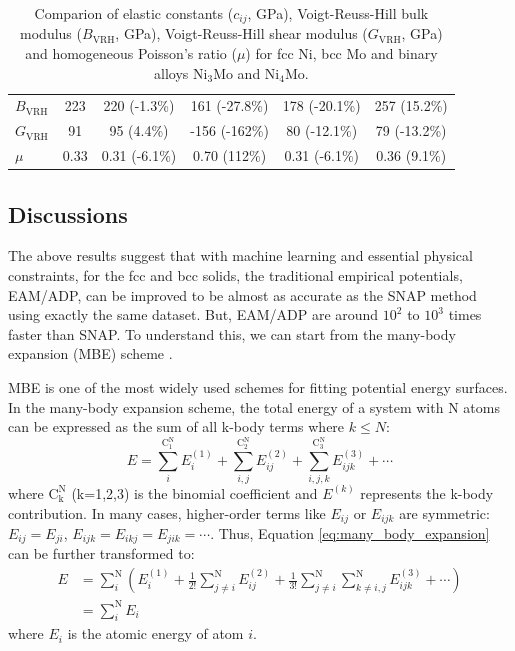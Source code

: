 \documentclass[final,3p,times]{elsarticle}
\begin{document}
\begin{table}
\begin{tabular}{lccccc}
$B_{\mathrm{VRH}}$ & 223  & 220 (-1.3\%)     & 161 (-27.8\%)   & 178 (-20.1\%) & 257 (15.2\%)  \\
$G_{\mathrm{VRH}}$ & 91   & 95 (4.4\%)       & -156 (-162\%)   & 80 (-12.1\%)  & 79 (-13.2\%)  \\
$\mu$              & 0.33 & 0.31 (-6.1\%)    & 0.70 (112\%)    & 0.31 (-6.1\%) & 0.36 (9.1\%)  \\
\hline
\end{tabular}
\caption{\label{table:NiMo_elastic_constants}
Comparion of elastic constants ($c_{ij}$, GPa), Voigt-Reuss-Hill bulk modulus 
($B_{\mathrm{VRH}}$, GPa), Voigt-Reuss-Hill shear modulus ($G_{\mathrm{VRH}}$, 
GPa) and homogeneous Poisson's ratio ($\mu$) for fcc Ni, bcc Mo and binary 
alloys Ni$_{3}$Mo and Ni$_{4}$Mo.
}
\end{table}

% 
%
\subsection{Discussions}
\label{sec:discussions}

The above results suggest that with machine learning and essential physical 
constraints, for the fcc and bcc solids, the traditional empirical potentials, 
EAM/ADP, can be improved to be almost as accurate as the SNAP method using 
exactly the same dataset. But, EAM/ADP are around $10^2$ to $10^3$ times faster 
than SNAP. To understand this, we can start from the many-body expansion (MBE) 
scheme \cite{kCON}.

MBE is one of the most widely used schemes for fitting potential energy 
surfaces. In the many-body expansion scheme, the total energy of a system with N 
atoms can be expressed as the sum of all k-body terms where $k \le N$:
\begin{equation}
\label{eq:many_body_expansion}
E = 
\sum_{i}^{\mathrm{C^N_1}}{E^{(1)}_{i}} +
\sum_{i,j}^{\mathrm{C^N_2}}{E^{(2)}_{ij}} + 
\sum_{i,j,k}^{\mathrm{C^N_3}}{E^{(3)}_{ijk}} + \cdots 
\end{equation}
where $\mathrm{C^N_k}$ (k=1,2,3) is the binomial coefficient and $E^{(k)}$ 
represents the k-body contribution. In many cases, higher-order terms like 
$E_{ij}$ or 
$E_{ijk}$ are symmetric: $E_{ij}=E_{ji}$, $E_{ijk}=E_{ikj}=E_{jik}=\cdots$. 
Thus, Equation \ref{eq:many_body_expansion} can be further transformed to:
\begin{align}
\label{eq:MBE_atomic}
E & = \sum_{i}^{\mathrm{N}}{\left(
    E^{(1)}_{i} + 
    \frac{1}{2!}\sum_{j \ne i}^{\mathrm{N}}{E^{(2)}_{ij}} +
    \frac{1}{3!}\sum_{j \ne i}^{\mathrm{N}}{
        \sum_{k \ne i,j}^{\mathrm{N}}{E^{(3)}_{ijk}}
    } +
    \cdots
\right)} \nonumber \\
& = \sum_{i}^{\mathrm{N}}{E_{i}}
\end{align}
where $E_{i}$ is the atomic energy of atom $i$. 
\end{document}

